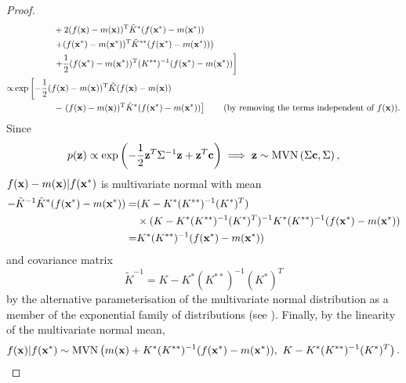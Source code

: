 \begin{proof}
\begin{align*}
                & \hphantom{\exp \left[
        -\frac{1}{2} \left( \right.\right.}
        + 2 (f(\bx)-m(\bx))^\mathrm{T}
        \tilde{K}^{\ast}
        (f(\bx^\ast)-m(\bx^\ast))                                      \\
                & \hphantom{\exp \left[
        -\frac{1}{2} \left( \right.\right.}
        \left.
        + (f(\bx^\ast)-m(\bx^\ast))^\mathrm{T}
        \tilde{K}^{**}
        (f(\bx^\ast)-m(\bx^\ast))
        \right)
        \\
                & \hphantom{\exp \left[
        -\frac{1}{2} \left( \right.\right.}\left.
        + \frac{1}{2} (f(\bx^\ast)-m(\bx^\ast))^\mathrm{T}
        (K^{**})^{-1}
        (f(\bx^\ast)-m(\bx^\ast))
        \right]                                                        \\
        \propto & \exp \left[
        -\frac{1}{2}
        (f(\bx)-m(\bx))^\mathrm{T}
        \tilde{K}
        (f(\bx)-m(\bx))\right.                                         \\
                & \hphantom{\exp \left[
        -\frac{1}{2} \left( \right.\right.}
        -\left.
        (f(\bx)-m(\bx))^\mathrm{T}
        \tilde{K}^{\ast}
        (f(\bx^\ast)-m(\bx^\ast))
        \right] \tag{by removing the terms independent of $f(\bx)$}.
    \end{align*}
    Since
    $$
        p(\mathbf{z})
        \propto \exp\left(
        -\frac{1}{2}\mathbf{z}^T\Sigma^{-1}\mathbf{z}
        + \mathbf{z}^T\mathbf{c}
        \right)
        \implies \mathbf{z} \sim \operatorname{MVN}\left(\Sigma \mathbf{c}, \Sigma\right),
    $$
    $f(\mathbf{x}) - m(\mathbf{x}) | f(\mathbf{x}^\ast)$ is
    multivariate normal with mean
    \begin{align*}
        - \tilde{K}^{-1}\tilde{K}^{\ast}(f(\mathbf{x}^\ast) - m(\mathbf{x}^\ast))
        = & (K - K^{\ast} (K^{**})^{-1} (K^{\ast})^T)                                   \\
          & \times(K - K^{\ast} (K^{**})^{-1} (K^{\ast})^T)^{-1} K^{\ast} (K^{**})^{-1}
        (f(\mathbf{x}^\ast) - m(\mathbf{x}^\ast))                                                     \\
        = & K^{\ast} (K^{**})^{-1}(f(\mathbf{x}^\ast) - m(\mathbf{x}^\ast))
    \end{align*}
    and covariance matrix
    $$
        \tilde{K}^{-1} = K - K^{\ast} (K^{**})^{-1} (K^{\ast})^T
    $$
    by the alternative parameterisation of the multivariate normal distribution
    as a member of the exponential family of distributions
    (see \cite[Table of Distributions]{noauthor_exponential_2024}).
    Finally, by the linearity of the multivariate normal mean,
    $$
        f(\mathbf{x}) | f(\mathbf{x}^\ast)
        \sim \operatorname{MVN}\left(
        m(\mathbf{x}) + K^{\ast}(K^{**})^{-1}(f(\mathbf{x}^\ast) - m(\mathbf{x}^\ast)), \,\,
        K - K^{\ast}(K^{**})^{-1}(K^{\ast})^T
        \right).
    $$
\end{proof}

